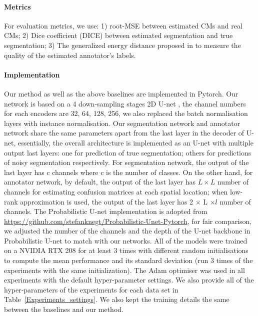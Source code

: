 \paragraph{Metrics}
For evaluation metrics, we use: 1) root-MSE between estimated CMs and real CMs; 2) Dice coefficient (DICE) between estimated segmentation and true segmentation; 3) The generalized energy distance proposed in \cite{kohl2018probabilistic} to measure the quality of the estimated annotator's labels.  



\paragraph{Implementation}
Our method as well as the above baselines are implemented in Pytorch. Our network is based on a 4 down-sampling stages 2D U-net \cite{ronneberger2015u}, the channel numbers for each encoders are 32, 64, 128, 256, we also replaced the batch normalisation layers with instance normalisation. Our segmentation network and annotator network share the same parameters apart from the last layer in the decoder of U-net, essentially, the overall architecture is implemented as an U-net with multiple output last layers: one for prediction of true segmentation; others for predictions of noisy segmentation respectively. For segmentation network, the output of the last layer has c channels where c is the number of classes. On the other hand, for annotator network, by default, the output of the last layer has  $L \times L$ number of channels for estimating confusion matrices at each spatial location; when low-rank approximation is used, the output of the last layer has 2 $\times$ L $\times l$  number of channels. The Probabilistic U-net implementation is adopted from \url{https://github.com/stefanknegt/Probabilistic-Unet-Pytorch}, for fair comparison, we adjusted the number of the channels and the depth of the U-net backbone in Probabilistic U-net to match with our networks. All of the models were trained on a NVIDIA RTX 208 for at least 3 times with different random initialisations to compute the mean performance and its standard deviation (run 3 times of the experiments with the same initialization). The Adam \cite{kingma2014adam} optimiser was used in all experiments with the default hyper-parameter settings. We also provide all of the hyper-parameters of the experiments for each data set in Table~\ref{Experiments_settings}. We also kept the training details the same between the baselines and our method.
\vspace{-2mm}
